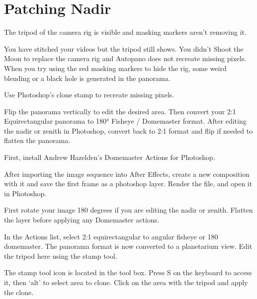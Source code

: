 \chapter{Patching Nadir}
\pagecolor{white}
\label{chap:48}
\begin{fullwidth}

\problem

{\large The tripod of the camera rig is visible and masking markers aren’t removing it. \par}

You have stitched your videos but the tripod still shows. You didn't Shoot the Moon to replace the camera rig and Autopano does not recreate missing pixels. When you try using the red masking markers to hide the rig, some weird blending or a black hole is generated in the panorama.

\solution

{\large Use Photoshop’s clone stamp to recreate missing pixels. \par}

Flip the panorama vertically to edit the desired area. Then convert your 2:1 Equirectangular panorama to 180° Fisheye / Domemaster format. After editing the nadir or zenith in Photoshop, convert back to 2:1 format and flip if needed to flatten the panorama.

First, install Andrew Hazelden's Domemaster Actions for Photoshop.

\clearpage

After importing the image sequence into After Effects, create a new composition with it and save the first frame as a photoshop layer. Render the file, and open it in Photoshop.


First rotate your image 180 degrees if you are editing the nadir or zenith. Flatten the layer before applying any Domemaster actions.


In the Actions list, select 2:1 equirectangular to angular fisheye or 180 domemaster. The panorama format is now converted to a planetarium view. Edit the tripod here using the stamp tool.

\tip The stamp tool icon is located in the tool box. Press S on the keyboard to access it, then ‘alt’ to select area to clone. Click on the area with the tripod and apply the clone.



\end{fullwidth}
